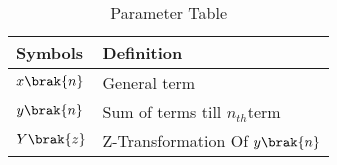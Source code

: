 \begin{table}[h]
\begin{tabular}{|l|l|}
\hline
\textbf{Symbols} & \textbf{Definition}\\ \hline
$x\brak{n}$ & General term \\ \hline
$y\brak{n}$ & Sum of terms till $n_{th}$term \\ \hline
$Y\brak{z}$ & Z-Transformation Of $y\brak{n}$\\ \hline
\end{tabular}
\caption{Parameter Table}
\label{tab:ncert 11.9.4.1}
\end{table}


